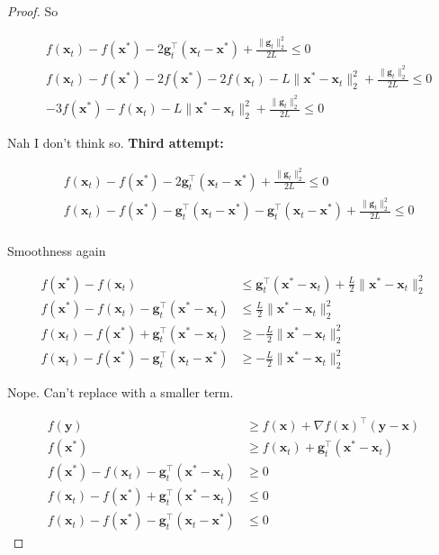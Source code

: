 \documentclass{article}
\begin{document}
\begin{proof}
	So
	
	\begin{align}
		&f(\mathbf{x}_t) - f(\mathbf{x}^*)  - 2 \mathbf{g}^\top_t(\mathbf{x}_t - \mathbf{x}^*) +\frac{\|\mathbf{g}_t\|^2_2}{2L} \le 0\\
		&f(\mathbf{x}_t) - f(\mathbf{x}^*)  - 2f(\mathbf{x}^*) - 2f(\mathbf{x}_t)   - L\|\mathbf{x}^* - \mathbf{x}_t \|^2_2 +\frac{\|\mathbf{g}_t\|^2_2}{2L} \le 0\\
		& -3f(\mathbf{x}^*) - f(\mathbf{x}_t)   - L\|\mathbf{x}^* - \mathbf{x}_t \|^2_2 +\frac{\|\mathbf{g}_t\|^2_2}{2L} \le 0	
	\end{align}
	
	Nah I don't think so. \textbf{Third attempt:}
	
	\begin{align}
		&f(\mathbf{x}_t) - f(\mathbf{x}^*)  - 2 \mathbf{g}^\top_t(\mathbf{x}_t - \mathbf{x}^*) +\frac{\|\mathbf{g}_t\|^2_2}{2L} \le 0\\
		&f(\mathbf{x}_t) - f(\mathbf{x}^*)  -\mathbf{g}^\top_t(\mathbf{x}_t - \mathbf{x}^*) -\mathbf{g}^\top_t(\mathbf{x}_t - \mathbf{x}^*) +\frac{\|\mathbf{g}_t\|^2_2}{2L} \le 0\\
	\end{align}
	
	Smoothness again
	
	\begin{align}
		f(\mathbf{x}^*) - f(\mathbf{x}_t) &\le \mathbf{g}_t^\top (\mathbf{x}^*-\mathbf{x}_t) + \frac{L}{2}\|\mathbf{x}^* - \mathbf{x}_t \|^2_2\\
		f(\mathbf{x}^*) - f(\mathbf{x}_t) - \mathbf{g}_t^\top (\mathbf{x}^*-\mathbf{x}_t) &\le  \frac{L}{2}\|\mathbf{x}^* - \mathbf{x}_t \|^2_2\\
		f(\mathbf{x}_t) - f(\mathbf{x}^*)  + \mathbf{g}_t^\top (\mathbf{x}^*-\mathbf{x}_t) &\ge  -\frac{L}{2}\|\mathbf{x}^* - \mathbf{x}_t \|^2_2\\
		f(\mathbf{x}_t) - f(\mathbf{x}^*)  - \mathbf{g}_t^\top (\mathbf{x}_t - \mathbf{x}^*) &\ge  -\frac{L}{2}\|\mathbf{x}^* - \mathbf{x}_t \|^2_2
	\end{align}
	
	Nope. Can't replace with a smaller term.
	
	\begin{align}
		f(\mathbf{y}) &\ge f(\mathbf{x}) + \nabla f(\mathbf{x})^\top (\mathbf{y}-\mathbf{x})\\
		f(\mathbf{x}^*) &\ge f(\mathbf{x}_t) +\mathbf{g}_t^\top (\mathbf{x}^*-\mathbf{x}_t)\\
		f(\mathbf{x}^*) - f(\mathbf{x}_t) -\mathbf{g}_t^\top (\mathbf{x}^*-\mathbf{x}_t) &\ge 0\\	 
		f(\mathbf{x}_t) - f(\mathbf{x}^*)  + \mathbf{g}_t^\top (\mathbf{x}^*-\mathbf{x}_t) &\le 0\\	 
		f(\mathbf{x}_t) - f(\mathbf{x}^*)  - \mathbf{g}_t^\top (\mathbf{x}_t - \mathbf{x}^*) &\le 0
	\end{align}	 
	

\end{proof}
\end{document}
